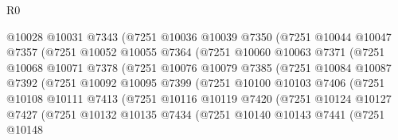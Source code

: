 \begin{lexlean}{R0}
\begin{coremodule}
                      @10028
                      @10031
                      @7343
                      (@7251
                        @10036
                        @10039
                        @7350
                        (@7251
                          @10044
                          @10047
                          @7357
                          (@7251
                            @10052
                            @10055
                            @7364
                            (@7251
                              @10060
                              @10063
                              @7371
                              (@7251
                                @10068
                                @10071
                                @7378
                                (@7251
                                  @10076
                                  @10079
                                  @7385
                                  (@7251
                                    @10084
                                    @10087
                                    @7392
                                    (@7251
                                      @10092
                                      @10095
                                      @7399
                                      (@7251
                                        @10100
                                        @10103
                                        @7406
                                        (@7251
                                          @10108
                                          @10111
                                          @7413
                                          (@7251
                                            @10116
                                            @10119
                                            @7420
                                            (@7251
                                              @10124
                                              @10127
                                              @7427
                                              (@7251
                                                @10132
                                                @10135
                                                @7434
                                                (@7251
                                                  @10140
                                                  @10143
                                                  @7441
                                                  (@7251
                                                    @10148

\end{coremodule}
\end{lexlean}
